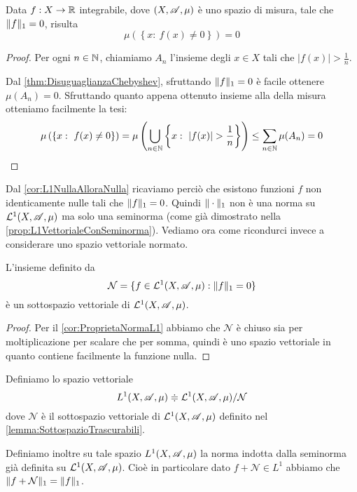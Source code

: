 \begin{corollary}\label{cor:L1NullaAlloraNulla}
	Data $f:X\to\mathbb R$ integrabile, dove $(X,\mathscr A,\mu)$ è uno spazio di misura, tale che $\Vert f\Vert_1=0$, risulta
	\begin{equation*}
		\mu\left(\left\{x:\ f(x)\not=0\right\}\right)=0
	\end{equation*}
\end{corollary}
\begin{proof}
	Per ogni $n\in\mathbb N$, chiamiamo $A_n$ l'insieme degli $x\in X$ tali che $|f(x)|>\frac 1n$.
	
	Dal \cref{thm:DisuguaglianzaChebyshev}, sfruttando $\Vert f\Vert_1=0$ è facile ottenere $\mu(A_n)=0$. 
	Sfruttando quanto appena ottenuto insieme alla \sigsubadd[ità] della misura otteniamo facilmente la tesi:
	\begin{equation*}
		\mu\left(\left\{x:\ f(x)\not=0\right\}\right)=\mu\left(\bigcup_{n\in\N}\left\{x:\ |f(x)|>\frac1n\right\}\right)\le\sum_{n\in\N}\mu(A_n)=0
	\end{equation*}
\end{proof}


Dal \cref{cor:L1NullaAlloraNulla} ricaviamo perciò che esistono funzioni $f$ non identicamente nulle tali che $\Vert f\Vert_1=0$. Quindi $\Vert \cdot\Vert_1$ non è una norma su $\mathcal L^1(X,\mathscr A,\mu)$ ma solo una seminorma (come già dimostrato nella \cref{prop:L1VettorialeConSeminorma}). Vediamo ora come ricondurci invece a considerare uno spazio vettoriale normato.

\begin{lemma}\label{lemma:SottospazioTrascurabili}
	L'insieme definito da
	\begin{equation*}
		\mathcal{N}=\{ f\in\mathcal L^1(X,\mathscr A,\mu) : \Vert f\Vert_1=0\}
	\end{equation*}
	è un sottospazio vettoriale di $\mathcal L^1(X,\mathscr A,\mu)$.
\end{lemma}
\begin{proof}
	Per il \cref{cor:ProprietaNormaL1} abbiamo che $\mathcal{N}$ è chiuso sia per moltiplicazione per scalare che per somma, quindi è uno spazio vettoriale in quanto contiene facilmente la funzione nulla.
\end{proof}

\begin{definition}
	Definiamo lo spazio vettoriale
	\begin{equation*}
		L^1(X,\mathscr A,\mu)\doteqdot \mathcal L^1(X,\mathscr A,\mu)/\mathcal{N}
	\end{equation*}
	dove $\mathcal{N}$ è il sottospazio vettoriale di $\mathcal L^1(X,\mathscr A,\mu)$ definito nel \cref{lemma:SottospazioTrascurabili}.
	
	Definiamo inoltre su tale spazio $L^1(X,\mathscr A,\mu)$ la norma indotta dalla seminorma già definita su $\mathcal L^1(X,\mathscr A,\mu)$. Cioè in particolare dato $f+\mathcal{N}\in L^1$ abbiamo che $\Vert f+\mathcal{N}\Vert_1=\Vert f\Vert_1$.
\end{definition}

